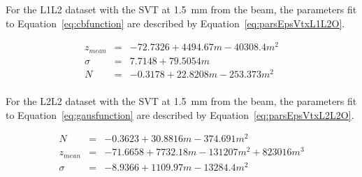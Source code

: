 For the L1L2 dataset with the SVT at 1.5~mm from the beam, the parameters fit to Equation~\eqref{eq:cbfunction} are described by Equation~\eqref{eq:parsEpsVtxL1L2O}.

\begin{eqnarray*}
\label{eq:parsEpsVtxL1L2O}
z_{mean} & = & -72.7326+4494.67m-40308.4m^2\\
\sigma & = & 7.7148+79.5054m\\
N & = & -0.3178+22.8208m-253.373m^2 \\
\end{eqnarray*}

For the L2L2 dataset with the SVT at 1.5~mm from the beam, the parameters fit to Equation~\eqref{eq:gausfunction} are described by Equation~\eqref{eq:parsEpsVtxL2L2O}.

\begin{eqnarray*}
\label{eq:parsEpsVtxL2L2O}
N & = & -0.3623+30.8816m-374.691m^2\\
z_{mean} & = & -71.6658+7732.18m-131207m^2+823016m^3\\
\sigma & = & -8.9366+1109.97m-13284.4m^2\\
\end{eqnarray*}
